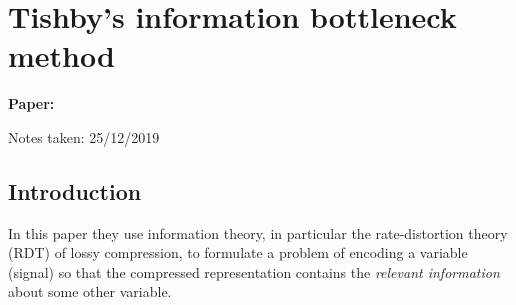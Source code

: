 \providecommand{\hx}{}
\renewcommand{\hx}{\hat{x}}
\providecommand{\hX}{}
\renewcommand{\hX}{\hat{X}}
\providecommand{\hmX}{}
\renewcommand{\hmX}{\hat{\mX}}


\clearpage

\section{Tishby's information bottleneck method}\label{sec:ibmethod}

\begin{notebox}
\textbf{Paper: } 

\hfill Notes taken: 25/12/2019 
\end{notebox}


\subsection{Introduction}


In this paper they use information theory, in particular the rate-distortion theory (RDT) of lossy compression, to formulate a problem of encoding a variable (signal) so that the compressed representation contains the \emph{relevant information} about some other variable.

